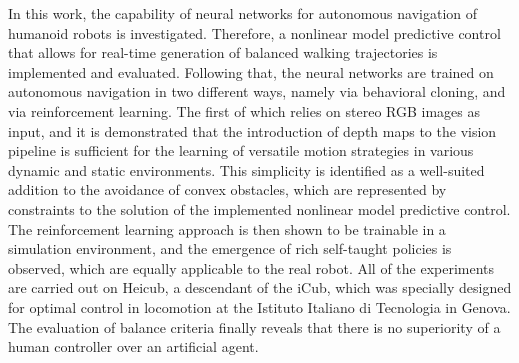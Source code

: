 In this work, the capability of neural networks for autonomous navigation of humanoid robots is investigated. Therefore, a nonlinear model predictive control that allows for real-time generation of balanced walking trajectories is implemented and evaluated. Following that, the neural networks are trained on autonomous navigation in two different ways, namely via behavioral cloning, and via reinforcement learning. The first of which relies on stereo RGB images as input, and it is demonstrated that the introduction of depth maps to the vision pipeline is sufficient for the learning of versatile motion strategies in various dynamic and static environments. This simplicity is identified as a well-suited addition to the avoidance of convex obstacles, which are represented by constraints to the solution of the implemented nonlinear model predictive control. The reinforcement learning approach is then shown to be trainable in a simulation environment, and the emergence of rich self-taught policies is observed, which are equally applicable to the real robot. All of the experiments are carried out on Heicub, a descendant of the iCub, which was specially designed for optimal control in locomotion at the Istituto Italiano di Tecnologia in Genova. The evaluation of balance criteria finally reveals that there is no superiority of a human controller over an artificial agent. 
